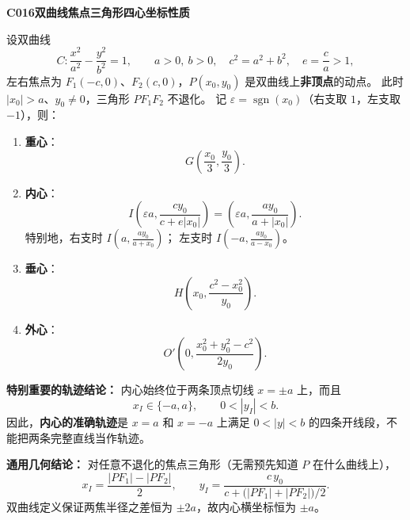 \begin{statementbox}
\textbf{C016\quad 双曲线焦点三角形四心坐标性质}

设双曲线
\[
C:\frac{x^2}{a^2}-\frac{y^2}{b^2}=1,\qquad
 a>0,\ b>0,\quad c^2=a^2+b^2,\quad e=\frac ca>1,
\]
左右焦点为 $F_1(-c,0)$、$F_2(c,0)$，$P(x_0,y_0)$ 是双曲线上\textbf{非顶点}的动点。
此时 $|x_0|>a$、$y_0\ne0$，三角形 $PF_1F_2$ 不退化。
记 $\varepsilon=\operatorname{sgn}(x_0)$（右支取 $1$，左支取 $-1$），则：
\begin{enumerate}
  \item \textbf{重心}：
  \[\boxed{G\left(\frac{x_0}{3},\frac{y_0}{3}\right)}.\]
  \item \textbf{内心}：
  \[
  \boxed{I\left(\varepsilon a,\frac{cy_0}{c+e|x_0|}\right)
  =\left(\varepsilon a,\frac{ay_0}{a+|x_0|}\right)}.
  \]
  特别地，右支时 $I\left(a,\frac{ay_0}{a+x_0}\right)$；
  左支时 $I\left(-a,\frac{ay_0}{a-x_0}\right)$。
  \item \textbf{垂心}：
  \[\boxed{H\left(x_0,\frac{c^2-x_0^2}{y_0}\right)}.\]
  \item \textbf{外心}：
  \[\boxed{O'\left(0,\frac{x_0^2+y_0^2-c^2}{2y_0}\right)}.\]
\end{enumerate}

\textbf{特别重要的轨迹结论：}
内心始终位于两条顶点切线 $x=\pm a$ 上，而且
\[
\boxed{x_I\in\{-a,a\},\qquad 0<|y_I|<b.}
\]
因此，\textbf{内心的准确轨迹}是 $x=a$ 和 $x=-a$ 上满足
$0<|y|<b$ 的四条开线段，不能把两条完整直线当作轨迹。

\textbf{通用几何结论：}
对任意不退化的焦点三角形（无需预先知道 $P$ 在什么曲线上），
\[
\boxed{x_I=\frac{|PF_1|-|PF_2|}{2}},\qquad
\boxed{y_I=\frac{c\,y_0}{c+\bigl(|PF_1|+|PF_2|\bigr)/2}}.
\]
双曲线定义保证两焦半径之差恒为 $\pm2a$，故内心横坐标恒为 $\pm a$。
\end{statementbox}

